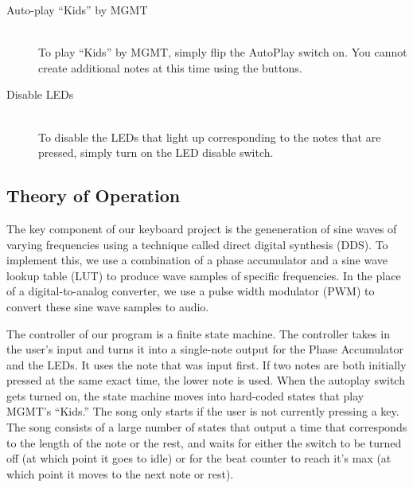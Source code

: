 \documentclass{article}
\begin{document}
\begin{description}
      \item[Auto-play ``Kids'' by MGMT] \hfill \\
        To play ``Kids'' by MGMT, simply flip the AutoPlay switch on. You cannot create additional notes at this time using the buttons.

      \item[Disable LEDs] \hfill \\
        To disable the LEDs that light up corresponding to the notes that are pressed, simply turn on the LED disable switch.
        
    \end{description}

  \subsection{Theory of Operation}
  

    The key component of our keyboard project is the geneneration of sine waves of varying frequencies using a technique called direct digital synthesis (DDS). To implement this, we use a combination of a phase accumulator and a sine wave lookup table (LUT) to produce wave samples of specific frequencies. In the place of a digital-to-analog converter, we use a pulse width modulator (PWM) to convert these sine wave samples to audio.

    The controller of our program is a finite state machine. The controller takes in the user's input and turns it into a single-note output for the Phase Accumulator and the LEDs. It uses the note that was input first. If two notes are both initially pressed at the same exact time, the lower note is used. When the autoplay switch gets turned on, the state machine moves into hard-coded states that play MGMT's ``Kids.'' The song only starts if the user is not currently pressing a key. The song consists of a large number of states that output a time that corresponds to the length of the note or the rest, and waits for either the switch to be turned off (at which point it goes to idle) or for the beat counter to reach it's max (at which point it moves to the next note or rest).
\end{document}
